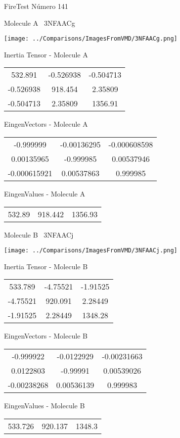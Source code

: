 \vtab[-3cm]
\begin{center}
{\large FireTest \tab Número 141}
\end{center}
\begin{multicols}{2}
\begin{center}

Molecule A \
3NFAACg

\texttt{[image: ../Comparisons/ImagesFromVMD/3NFAACg.png]}

Inertia Tensor - Molecule A \\
\begin{tabular}{|c c c|}
532.891	 & 	-0.526938	 & 	-0.504713	 \\
-0.526938	 & 	918.454	 & 	2.35809	 \\
-0.504713	 & 	2.35809	 & 	1356.91
\end{tabular}

\vtab
 EingenVectors - Molecule A     \\
\begin{tabular}{|c c c|}
-0.999999	 & 	-0.00136295	 & 	-0.000608598	 \\
0.00135965	 & 	-0.999985	 & 	0.00537946	 \\
-0.000615921	 & 	0.00537863	 & 	0.999985
\end{tabular}

\vtab
 EingenValues - Molecule A     \\
\begin{tabular}{|c c c|}
532.89	 & 	918.442	 & 	1356.93	 \\
\end{tabular}
\columnbreak

Molecule B \
3NFAACj

\texttt{[image: ../Comparisons/ImagesFromVMD/3NFAACj.png]}

Inertia Tensor - Molecule B \\
\begin{tabular}{|c c c|}
533.789	 & 	-4.75521	 & 	-1.91525	 \\
-4.75521	 & 	920.091	 & 	2.28449	 \\
-1.91525	 & 	2.28449	 & 	1348.28
\end{tabular}

\vtab
 EingenVectors - Molecule B     \\
\begin{tabular}{|c c c|}
-0.999922	 & 	-0.0122929	 & 	-0.00231663	 \\
0.0122803	 & 	-0.99991	 & 	0.00539026	 \\
-0.00238268	 & 	0.00536139	 & 	0.999983
\end{tabular}

\vtab
 EingenValues - Molecule B     \\
\begin{tabular}{|c c c|}
533.726	 & 	920.137	 & 	1348.3	 \\
\end{tabular}

\end{center}
\end{multicols}


